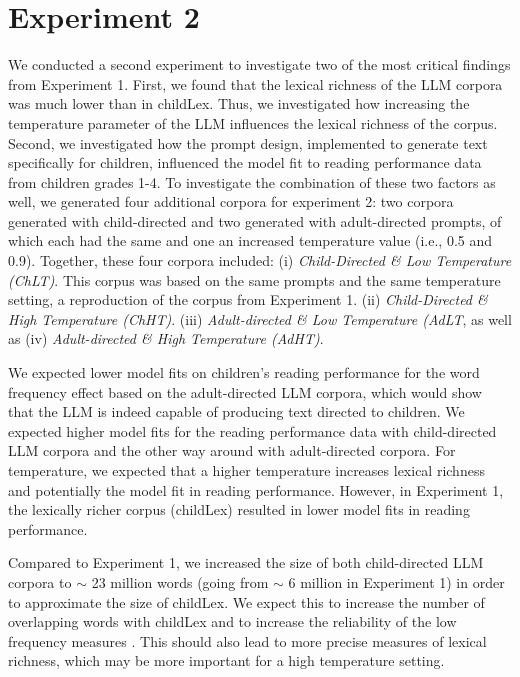 \documentclass[doc, a4paper]{apa7}
\begin{document}
\section{Experiment 2}

We conducted a second experiment to investigate two of the most critical findings from Experiment 1. First, we found that the lexical richness of the LLM corpora was much lower than in childLex. Thus, we investigated how increasing the temperature parameter of the LLM influences the lexical richness of the corpus. Second, we investigated how the prompt design, implemented to generate text specifically for children, influenced the model fit to reading performance data from children grades 1-4. To investigate the combination of these two factors as well, we generated four additional corpora for experiment 2: two corpora generated with child-directed and two generated with adult-directed prompts, of which each had the same and one an increased temperature value (i.e., 0.5 and 0.9). Together, these four corpora included: (i) \textit{Child-Directed \& Low Temperature (ChLT)}. This corpus was based on the same prompts and the same temperature setting, a reproduction of the corpus from Experiment 1. (ii) \textit{Child-Directed \& High Temperature (ChHT)}. (iii) \textit{Adult-directed \& Low Temperature (AdLT}, as well as (iv) \textit{Adult-directed \& High Temperature (AdHT)}.

We expected lower model fits on children's reading performance for the word frequency effect based on the adult-directed LLM corpora, which would show that the LLM is indeed capable of producing text directed to children. We expected higher model fits for the reading performance data with child-directed LLM corpora and the other way around with adult-directed corpora. For temperature, we expected that a higher temperature increases lexical richness and potentially the model fit in reading performance. However, in Experiment 1, the lexically richer corpus (childLex) resulted in lower model fits in reading performance.  

Compared to Experiment 1, we increased the size of both child-directed LLM corpora to $\sim$ 23 million words (going from $\sim$ 6 million in Experiment 1) in order to approximate the size of childLex. We expect this to increase the number of overlapping words with childLex and to increase the reliability of the low frequency measures \citep{gernsbacher_resolving_1984}. This should also lead to more precise measures of lexical richness, which may be more important for a high temperature setting. 
\end{document}
